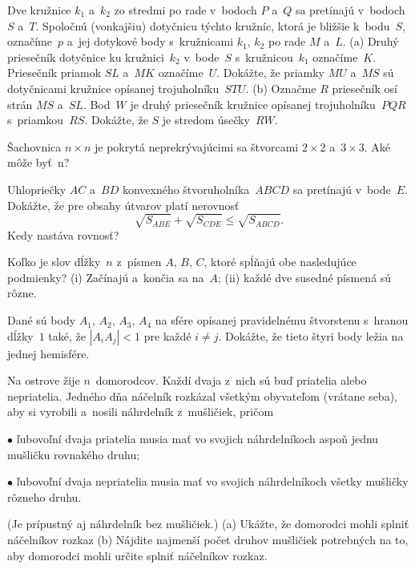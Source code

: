 {%
Dve kružnice $k_1$ a~$k_2$ zo stredmi po rade v~bodoch $P$ a~$Q$ sa pretínajú v~bodoch
$S$ a~$T$. Spoločnú (vonkajšiu) dotyčnicu týchto kružníc, ktorá je bližšie k~bodu~$S$,
označíme~$p$ a~jej dotykové body s~kružnicami $k_1$, $k_2$ po rade $M$ a~$L$.
\ite (a) Druhý priesečník dotyčnice ku kružnici~$k_2$ v~bode~$S$ s~kružnicou~$k_1$
označíme~$K$. Priesečník priamok $SL$ a~$MK$ označíme~$U$. Dokážte, že priamky $MU$ a~$MS$
sú dotyčnicami kružnice opísanej trojuholníku~$STU$.
\ite (b) Označme $R$ priesečník osí strán $MS$ a~$SL$. Bod~$W$ je druhý priesečník
kružnice opísanej trojuholníku~$PQR$ s~priamkou~$RS$. Dokážte, že $S$ je stredom úsečky~$RW$.}

{%
Šachovnica $n \times n$ je pokrytá neprekrývajúcimi sa štvorcami $2 \times 2$ a~$3 \times 3$.
Aké môže byť~n?}

{%
Uhlopriečky $AC$ a~$BD$ konvexného štvoruholníka~$ABCD$ sa pretínajú v~bode~$E$.
Dokážte, že pre obsahy útvarov platí nerovnosť
$$
\sqrt{S_{ABE}} + \sqrt{S_{CDE}} \le \sqrt{S_{ABCD}}.
$$
Kedy nastáva rovnosť?}

{%
Koľko je slov dĺžky~$n$ z~písmen $A$, $B$, $C$, ktoré spĺňajú obe nasledujúce podmienky?
\ite (i) Začínajú a~končia sa na~$A$;
\ite (ii) každé dve susedné písmená sú rôzne.}

{%
Dané sú body $A_1$, $A_2$, $A_3$, $A_4$ na sfére opísanej pravidelnému štvorstenu
s~hranou dĺžky~$1$ také, že $|A_iA_j|<1$ pre každé $i\ne j$. Dokážte, že tieto štyri
body ležia na jednej hemisfére.}

{%
Na ostrove žije $n$~domorodcov. Každí dvaja z~nich sú buď priatelia alebo nepriatelia.
Jedného dňa náčelník rozkázal všetkým obyvateľom (vrátane seba), aby si vyrobili a~nosili
náhrdelník z~mušličiek, pričom
\item{$\bullet$} ľubovoľní dvaja priatelia musia mať vo svojich náhrdelníkoch aspoň
jednu mušličku rovnakého druhu;
\item{$\bullet$} ľubovoľní dvaja nepriatelia musia mať vo svojich náhrdelníkoch
všetky mušličky rôzneho druhu.

(Je prípustný aj náhrdelník bez mušličiek.)
\ite (a) Ukážte, že domorodci mohli splniť náčelníkov rozkaz
\ite (b) Nájdite najmenší počet druhov mušličiek potrebných na to, aby domorodci
mohli určite splniť náčelníkov rozkaz.}

